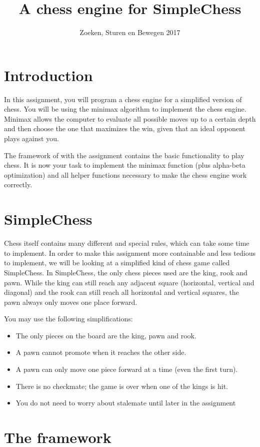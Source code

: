 \documentclass{article}
\title{A chess engine for SimpleChess}
\author{Zoeken, Sturen en Bewegen 2017}
\date{}
\begin{document}
\maketitle

\section*{Introduction}
In this assignment, you will program a chess engine for a simplified version of chess. You will be using the minimax algorithm to implement the chess engine. Minimax allows the computer to evaluate all possible moves up to a certain depth and then choose the one that maximizes the win, given that an ideal opponent plays against you.

The framework of with the assignment contains the basic functionality to play chess. It is now your task to implement the minimax function (plus alpha-beta optimization) and all helper functions necessary to make the chess engine work correctly. 


\section*{SimpleChess}
Chess itself contains many different and special rules, which can take some time to implement. In order to make this assignment more containable and less tedious to implement, we will be looking at a simplified kind of chess game called SimpleChess. In SimpleChess, the only chess pieces used are the king, rook and pawn. While the king can still reach any adjacent square (horizontal, vertical and diagonal) and the rook can still reach all horizontal and vertical squares, the pawn always only moves one place forward.

You may use the following simplifications:
\begin{itemize}
    \item The only pieces on the board are the king, pawn and rook.
    \item A pawn cannot promote when it reaches the other side.
    \item A pawn can only move one piece forward at a time (even the first turn).
    \item There is no checkmate; the game is over when one of the kings is hit.
    \item You do not need to worry about stalemate until later in the assignment
\end{itemize}

\section*{The framework}
\end{document}
